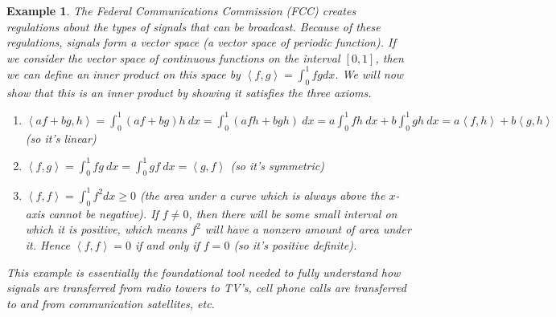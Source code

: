 \documentclass[10pt]{article}
\theoremstyle{plain}
\theoremstyle{box}
\newtheorem{example}{Example}
\begin{document}
\begin{example}
The Federal Communications Commission (FCC) creates regulations about the types of signals that can be broadcast.  Because of these regulations, signals form a vector space (a vector space of periodic function). If we consider the vector space of continuous functions on the interval $[0,1]$, then we can define an inner product on this space by $\left<f,g\right> = \int_0^1 fg dx$. We will now show that this is an inner product by showing it satisfies the three axioms.
\begin{enumerate}
	\item $\left<af +bg,h\right> =\int_0^1(af+bg)h\ dx = \int_0^1(afh+bgh)\ dx = a\int_0^1fh\ dx + b\int_0^1gh\ dx =  a\left<f,h\right> +b\left<g,h\right> $ (so it's linear)
	\item $\left<f,g\right> =  \int_0^1fg\ dx = \int_0^1gf\ dx = \left<g,f\right>$ (so it's symmetric) 
 	\item $\left<f,f\right> = \int_0^1 f^2 dx \geq 0$ (the area under a curve which is always above the $x$-axis cannot be negative). If $f\neq 0$, then there will be some small interval on which it is positive, which means $f^2$ will have a nonzero amount of area under it.  Hence $\left<f,f\right> =0$ if and only if $f=0$ (so it's positive definite).  
\end{enumerate}
This example is essentially the foundational tool needed to fully understand how signals are transferred from radio towers to TV's, cell phone calls are transferred to and from communication satellites, etc.
\end{example}
\end{document}
